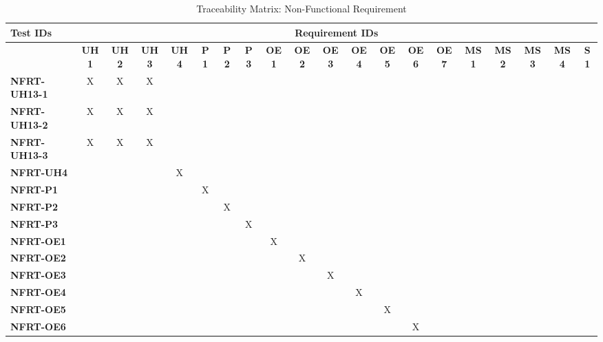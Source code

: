 \documentclass[12pt, titlepage]{article}
\begin{document}
\begin{landscape}
\begin{table}[H]
    \centering
    \caption{Traceability Matrix: Non-Functional Requirement}
    \begin{adjustbox}{width=\paperwidth}
    \begin{tabular}{l|ccccccccccccccccccc}
        \textbf{Test IDs} & \multicolumn{19}{c}{\textbf{Requirement IDs}}\\
        \hline
        ~ & \textbf{UH1} & \textbf{UH2} & \textbf{UH3} & \textbf{UH4} & \textbf{P1} & \textbf{P2} & \textbf{P3} & \textbf{OE1} & \textbf{OE2} & \textbf{OE3} & \textbf{OE4} & \textbf{OE5} & \textbf{OE6} & \textbf{OE7} & \textbf{MS1} & \textbf{MS2} & \textbf{MS3} & \textbf{MS4} & \textbf{S1}\\
        \textbf{NFRT-UH13-1}    & X & X & X & ~ & ~ & ~ & ~ & ~ & ~ & ~ & ~ & ~ & ~ & ~ & ~ & ~ & ~ & ~ & ~\\
        \textbf{NFRT-UH13-2}    & X & X & X & ~ & ~ & ~ & ~ & ~ & ~ & ~ & ~ & ~ & ~ & ~ & ~ & ~ & ~ & ~ & ~\\
        \textbf{NFRT-UH13-3}    & X & X & X & ~ & ~ & ~ & ~ & ~ & ~ & ~ & ~ & ~ & ~ & ~ & ~ & ~ & ~ & ~ & ~\\
        \textbf{NFRT-UH4}       & ~ & ~ & ~ & X & ~ & ~ & ~ & ~ & ~ & ~ & ~ & ~ & ~ & ~ & ~ & ~ & ~ & ~ & ~\\
        \textbf{NFRT-P1}        & ~ & ~ & ~ & ~ & X & ~ & ~ & ~ & ~ & ~ & ~ & ~ & ~ & ~ & ~ & ~ & ~ & ~ & ~\\
        \textbf{NFRT-P2}        & ~ & ~ & ~ & ~ & ~ & X & ~ & ~ & ~ & ~ & ~ & ~ & ~ & ~ & ~ & ~ & ~ & ~ & ~\\
        \textbf{NFRT-P3}        & ~ & ~ & ~ & ~ & ~ & ~ & X & ~ & ~ & ~ & ~ & ~ & ~ & ~ & ~ & ~ & ~ & ~ & ~\\
        \textbf{NFRT-OE1}       & ~ & ~ & ~ & ~ & ~ & ~ & ~ & X & ~ & ~ & ~ & ~ & ~ & ~ & ~ & ~ & ~ & ~ & ~\\
        \textbf{NFRT-OE2}       & ~ & ~ & ~ & ~ & ~ & ~ & ~ & ~ & X & ~ & ~ & ~ & ~ & ~ & ~ & ~ & ~ & ~ & ~\\
        \textbf{NFRT-OE3}       & ~ & ~ & ~ & ~ & ~ & ~ & ~ & ~ & ~ & X & ~ & ~ & ~ & ~ & ~ & ~ & ~ & ~ & ~\\
        \textbf{NFRT-OE4}       & ~ & ~ & ~ & ~ & ~ & ~ & ~ & ~ & ~ & ~ & X & ~ & ~ & ~ & ~ & ~ & ~ & ~ & ~\\
        \textbf{NFRT-OE5}       & ~ & ~ & ~ & ~ & ~ & ~ & ~ & ~ & ~ & ~ & ~ & X & ~ & ~ & ~ & ~ & ~ & ~ & ~\\
        \textbf{NFRT-OE6}       & ~ & ~ & ~ & ~ & ~ & ~ & ~ & ~ & ~ & ~ & ~ & ~ & X & ~ & ~ & ~ & ~ & ~ & ~\\

\end{tabular}
\end{adjustbox}
\end{table}
\end{landscape}
\end{document}
